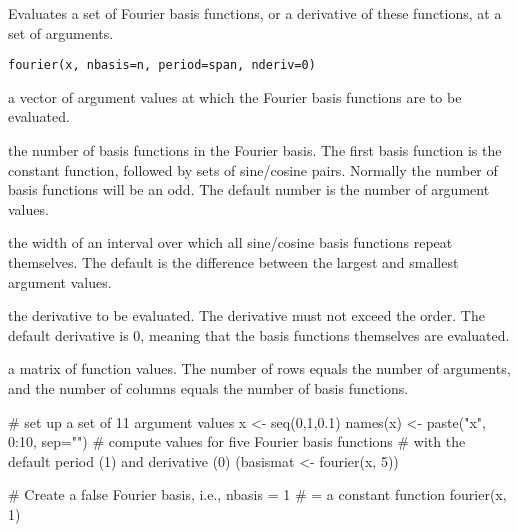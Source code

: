 \documentclass{article}
\begin{document}
\begin{Description}\relax
Evaluates a set of Fourier basis functions, or a derivative of these
functions, at a set of arguments.
\end{Description}
\begin{Usage}
\begin{verbatim}
fourier(x, nbasis=n, period=span, nderiv=0)
\end{verbatim}
\end{Usage}
\begin{Arguments}
\begin{ldescription}
\item[\code{x}] a vector of argument values at which the Fourier basis functions are
to be evaluated.

\item[\code{nbasis}] the number of basis functions in the Fourier basis.  The first basis
function is the constant function, followed by sets of  sine/cosine
pairs.  Normally the number of basis functions will be an odd.  The
default number is the number of argument values.

\item[\code{period}] the width of an interval over which all sine/cosine basis functions
repeat themselves. The default is the difference between the largest
and smallest argument values.

\item[\code{nderiv}] the derivative to be evaluated.  The derivative must not exceed the
order.  The default derivative is 0, meaning that the basis functions
themselves are evaluated.

\end{ldescription}
\end{Arguments}
\begin{Value}
a matrix of function values.  The number of rows equals the number of
arguments, and the number of columns equals the number of basis functions.
\end{Value}
\begin{SeeAlso}\relax
{}
\end{SeeAlso}
\begin{Examples}
\begin{ExampleCode}

#  set up a set of 11 argument values
x <- seq(0,1,0.1)
names(x) <- paste("x", 0:10, sep="")
#  compute values for five Fourier basis functions
#  with the default period (1) and derivative (0)
(basismat <- fourier(x, 5))

# Create a false Fourier basis, i.e., nbasis = 1
# = a constant function
fourier(x, 1)

\end{ExampleCode}
\end{Examples}
\end{document}
